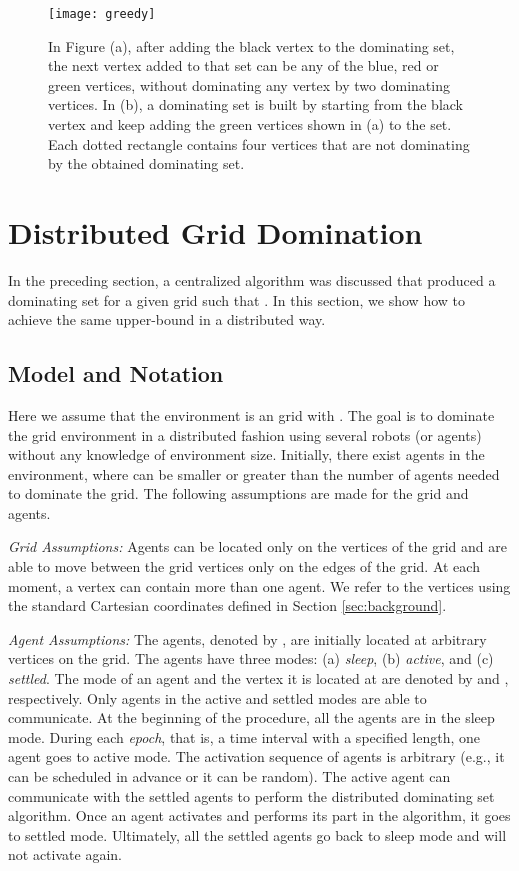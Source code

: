 \documentclass[letterpaper, 10pt, conference]{ieeeconf}
\theoremstyle{definition}
\theoremstyle{remark}
\begin{document}
\begin{figure}[t]
\texttt{[image: greedy]}
\caption{In Figure (a), after adding the black vertex to the dominating set, the next vertex added to that set can be any of the blue, red or green vertices, without dominating any vertex by two dominating vertices. In (b), a dominating set is built by starting from the black vertex and keep adding the green vertices shown in (a) to the set. Each dotted rectangle contains four vertices that are not dominating by the obtained dominating set.}
\label{fig:greedy}
\end{figure}

\section{Distributed Grid Domination}
\label{sec:dist-domin}
In the preceding section, a centralized algorithm was discussed that produced a dominating set  for a given  grid  such that . In this section, we show how to achieve the same upper-bound in a distributed way.


\subsection{Model and Notation}
\label{subsec:model2}
Here we assume that the environment is an  grid  with . The goal is to dominate the grid environment in a distributed fashion using several robots (or agents) without any knowledge of environment size. Initially, there exist  agents in the environment, where  can be smaller or greater than the number of agents needed to dominate the grid. The following assumptions are made for the grid and agents.


\emph{Grid Assumptions:} Agents can be located only on the vertices of the grid and are able to move between the grid vertices only on the edges of the grid. At each moment, a vertex can contain more than one agent. We refer to the vertices using the standard Cartesian coordinates defined in Section \ref{sec:background}.


\emph{Agent Assumptions:} The agents, denoted by , are initially located at arbitrary vertices on the grid.
The agents have three modes: (a) \emph{sleep}, (b) \emph{active}, and (c) \emph{settled}. The mode of an agent  and the vertex it is located at are denoted by  and , respectively. Only agents in the active and settled modes are able to communicate. At the beginning of the procedure, all the agents are in the sleep mode. During each \emph{epoch}, that is, a time interval with a specified length, one agent goes to active mode. The activation sequence of agents is arbitrary (e.g., it can be scheduled in advance or it can be random). The active agent can communicate with the settled agents to perform the distributed dominating set algorithm. Once an agent activates and performs its part in the algorithm, it goes to settled mode. Ultimately, all the settled agents go back to sleep mode and will not activate again.
\end{document}

